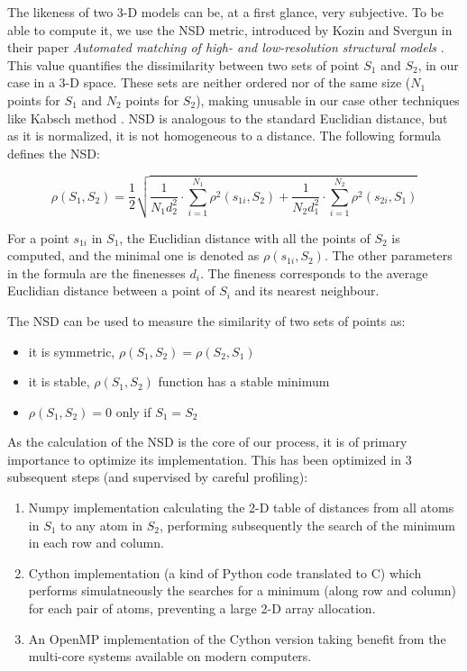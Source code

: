 \documentclass[a4paper, 11pt]{report}
\begin{document}
The likeness of two 3-D models can be, at a first glance, very 
subjective. 
To be able to compute it, we use the NSD metric, introduced by Kozin 
and Svergun in their paper \textit{Automated matching of high- and 
low-resolution structural models} \cite{supcomb}. 
This value quantifies the dissimilarity between two sets of 
point $S_{1}$ and $S_{2}$, in our case in a 3-D space.
These sets are neither ordered nor of the same size ($N_{1}$ points 
for $S_{1}$ and $N_{2}$ points for $S_{2}$), making unusable in our 
case other techniques like Kabsch method \cite{kabsch1976}.
NSD is analogous to the standard Euclidian distance, but as it is 
normalized, it is not homogeneous to a distance. 
The following formula defines the NSD:

\[
\rho(S_{1},S_{2})= \frac{1}{2} \sqrt {\frac{1}{N_{1}d_{2}^2} 
\cdot \sum\limits_{i=1}^{N_{1}} \rho^2(s_{1i}, S_{2}) + \frac{1}{N_{2}d_{1}^2} \cdot \sum\limits_{i=1}^{N_{2}} \rho^2(s_{2i}, S_{1})}
\]

For a point $s_{1i}$ in $S_{1}$, the Euclidian distance with all the 
points of $S_{2}$ is computed, and the minimal one is denoted as 
$\rho(s_{1i}, S_{2})$. 
The other parameters in the formula are the finenesses $d_{i}$. 
The fineness corresponds to the average Euclidian distance between a 
point of $S_{i}$ and its nearest neighbour.

The NSD can be used to measure the similarity of two sets of points as:
\begin{itemize}
 \item it is symmetric, $\rho(S_{1},S_{2}) = \rho(S_{2},S_{1})$
 \item it is stable, $\rho(S_{1},S_{2})$ function has a stable minimum
 \item $\rho(S_{1},S_{2}) = 0$ only if $S_{1} = S_{2}$
\end{itemize}

As the calculation of the NSD is the core of our process, it is of 
primary importance to optimize its implementation. This has been 
optimized in 3 subsequent steps (and supervised by careful profiling):
\begin{enumerate}
  \item Numpy implementation calculating the 2-D table of distances from all
  atoms in $S_{1}$ to any atom in $S_{2}$, performing subsequently the search 
  of the minimum in each row and column.
  \item Cython implementation \cite{cython} (a kind of Python code translated
  to C) which performs simulatneously the searches for a minimum (along row 
  and column) for each pair of atoms, preventing a large 2-D array allocation.
  \item An OpenMP \cite{openmp} implementation of the Cython version taking
  benefit from the multi-core systems available on modern computers.
\end{enumerate}
\end{document}
